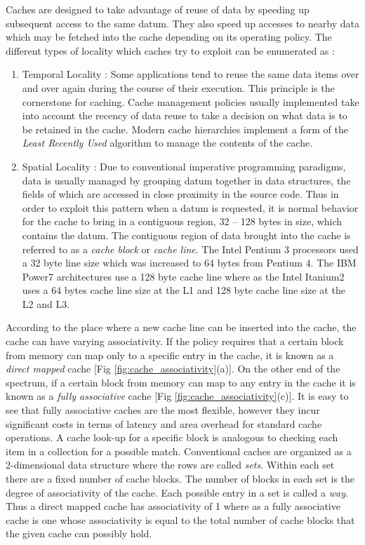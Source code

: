 Caches are designed to take advantage of reuse of data by speeding up subsequent access to the same datum. They also speed up accesses to nearby data which may be fetched into the cache depending on its operating policy. The different types of locality which caches try to exploit can be enumerated as :

\begin{enumerate}
  \item Temporal Locality : Some applications tend to reuse the same data items over and over again during the course of their execution. This principle is the cornerstone for caching. Cache management policies usually implemented take into account the recency of data reuse to take a decision on what data is to be retained in the cache. Modern cache hierarchies implement a form of the \textit{Least Recently Used} algorithm to manage the contents of the cache.
  \item Spatial Locality : Due to conventional imperative programming paradigms, data is usually managed by grouping datum together in data structures, the fields of which are accessed in close proximity in the source code. Thus in order to exploit this pattern when a datum is requested, it is normal behavior for the cache to bring in a contiguous region, 32 -- 128 bytes in size, which contains the datum. The contiguous region of data brought into the cache is referred to as a \textit{cache block} or \textit{cache line}. The Intel Pentium 3 processors used a 32 byte line size which was increased to 64 bytes from Pentium 4. The IBM Power7 architectures use a 128 byte cache line where as the Intel Itanium2 uses a 64 bytes cache line size at the L1 and 128 byte cache line size at the L2 and L3.
\end{enumerate}

According to the place where a new cache line can be inserted into the cache, the cache can have varying associativity. If the policy requires that a certain block from memory can map only to a specific entry in the cache, it is known as a \textit{direct mapped} cache [Fig \ref{fig:cache_associativity}(a)]. On the other end of the spectrum, if a certain block from memory can map to any entry in the cache it is known as a \textit{fully associative} cache [Fig \ref{fig:cache_associativity}(c)].  It is easy to see that fully associative caches are the most flexible, however they incur significant costs in terms of latency and area overhead for standard cache operations. A cache look-up for a specific block is analogous to checking each item in a collection for a possible match. Conventional caches are organized as a 2-dimensional data structure where the rows are called \textit{sets}. Within each set there are a fixed number of cache blocks. The number of blocks in each set is the degree of associativity of the cache. Each possible entry in a set is called a \textit{way}. Thus a direct mapped cache has associativity of 1 where as a fully associative cache is one whose associativity is equal to the total number of cache blocks that the given cache can possibly hold.  


